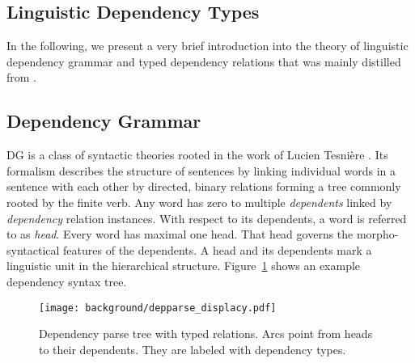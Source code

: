 \subsection{Linguistic Dependency Types}
In the following, we present a very brief introduction into the theory of linguistic dependency grammar and typed dependency relations that was mainly distilled from \textcite{jurafsky_dependency_2014}.

\subsection{Dependency Grammar}
\ac{DG} is a class of syntactic theories rooted in the work of Lucien Tesni\`{e}re \autocite{tesniere_elements_1976}. Its formalism describes the structure of sentences by linking individual words in a sentence with each other by directed, binary relations forming a tree commonly rooted by the finite verb. Any word has zero to multiple \textit{dependents} linked by \textit{dependency} relation instances. With respect to its dependents, a word is referred to as \textit{head}. Every word has maximal one head. That head governs the morpho-syntactical features of the dependents. A head and its dependents mark a linguistic unit in the hierarchical structure. Figure~\ref{fig:displacy_deps} shows an example dependency syntax tree.

\begin{figure}[htb!]
  \centering
  \texttt{[image: background/depparse\_displacy.pdf]}
  \caption{Dependency parse tree with typed relations. Arcs point from heads to their dependents. They are labeled with dependency types.}
  \label{fig:displacy_deps}
 \end{figure}


